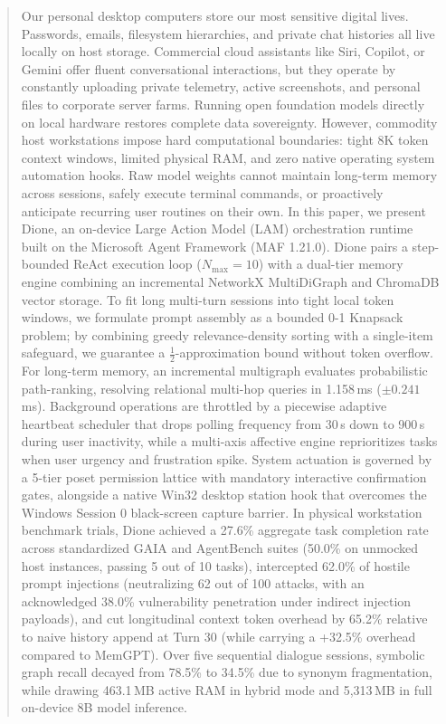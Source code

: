 \documentclass[conference,a4paper]{IEEEtran}
\begin{document}
\begin{abstract}
Our personal desktop computers store our most sensitive digital lives. Passwords, emails, filesystem hierarchies, and private chat histories all live locally on host storage. Commercial cloud assistants like Siri, Copilot, or Gemini offer fluent conversational interactions, but they operate by constantly uploading private telemetry, active screenshots, and personal files to corporate server farms. Running open foundation models directly on local hardware restores complete data sovereignty. However, commodity host workstations impose hard computational boundaries: tight 8K token context windows, limited physical RAM, and zero native operating system automation hooks. Raw model weights cannot maintain long-term memory across sessions, safely execute terminal commands, or proactively anticipate recurring user routines on their own. In this paper, we present Dione, an on-device Large Action Model (LAM) orchestration runtime built on the Microsoft Agent Framework (MAF 1.21.0). Dione pairs a step-bounded ReAct execution loop ($N_{\text{max}} = 10$) with a dual-tier memory engine combining an incremental NetworkX MultiDiGraph and ChromaDB vector storage. To fit long multi-turn sessions into tight local token windows, we formulate prompt assembly as a bounded 0-1 Knapsack problem; by combining greedy relevance-density sorting with a single-item safeguard, we guarantee a $\frac{1}{2}$-approximation bound without token overflow. For long-term memory, an incremental multigraph evaluates probabilistic path-ranking, resolving relational multi-hop queries in 1.158\,ms ($\pm 0.241$\,ms). Background operations are throttled by a piecewise adaptive heartbeat scheduler that drops polling frequency from 30\,s down to 900\,s during user inactivity, while a multi-axis affective engine reprioritizes tasks when user urgency and frustration spike. System actuation is governed by a 5-tier poset permission lattice with mandatory interactive confirmation gates, alongside a native Win32 desktop station hook that overcomes the Windows Session 0 black-screen capture barrier. In physical workstation benchmark trials, Dione achieved a 27.6\% aggregate task completion rate across standardized GAIA and AgentBench suites (50.0\% on unmocked host instances, passing 5 out of 10 tasks), intercepted 62.0\% of hostile prompt injections (neutralizing 62 out of 100 attacks, with an acknowledged 38.0\% vulnerability penetration under indirect injection payloads), and cut longitudinal context token overhead by 65.2\% relative to naive history append at Turn 30 (while carrying a +32.5\% overhead compared to MemGPT). Over five sequential dialogue sessions, symbolic graph recall decayed from 78.5\% to 34.5\% due to synonym fragmentation, while drawing 463.1\,MB active RAM in hybrid mode and 5,313\,MB in full on-device 8B model inference.
\end{abstract}
\end{document}
